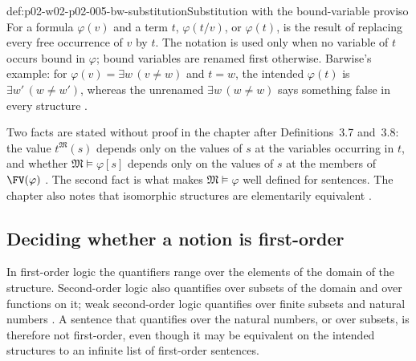 \begin{hbconvention}{def:p02-w02-p02-005-bw-substitution}{Substitution with the bound-variable proviso}
For a formula \(\varphi(v)\) and a term \(t\), \(\varphi(t/v)\), or
\(\varphi(t)\), is the result of replacing every free occurrence of \(v\)
by \(t\).  The notation is used only when no variable of \(t\) occurs bound
in \(\varphi\); bound variables are renamed first otherwise.  Barwise's
example: for \(\varphi(v)=\exists w\,(v\neq w)\) and \(t=w\), the intended
\(\varphi(t)\) is \(\exists w'\,(w\neq w')\), whereas the unrenamed
\(\exists w\,(w\neq w)\) says something false in every structure
\cite[ch.~A.1, \S3, p.~22]{Barwise1977FirstOrder}.
\end{hbconvention}

Two facts are stated without proof in the chapter after
Definitions~3.7 and~3.8: the value \(t^{\mathfrak M}(s)\) depends only on
the values of \(s\) at the variables occurring in \(t\), and whether
\(\mathfrak M\models\varphi[s]\) depends only on the values of \(s\) at the
members of \(\FV(\varphi)\) \cite[ch.~A.1, \S3, pp.~21--22]{Barwise1977FirstOrder}.
The second fact is what makes \(\mathfrak M\models\varphi\) well defined
for sentences.  The chapter also notes that isomorphic structures are
elementarily equivalent \cite[ch.~A.1, \S3, p.~22]{Barwise1977FirstOrder}.

\subsection{Deciding whether a notion is first-order}
\label{sec:p02-w02-p02-005-barwise-realm}

In first-order logic the quantifiers range over the elements of the domain
of the structure.  Second-order logic also quantifies over subsets of the
domain and over functions on it; weak second-order logic quantifies over
finite subsets and natural numbers \cite[ch.~A.1, \S2, p.~7]{Barwise1977FirstOrder}.
A sentence that quantifies over the natural numbers, or over subsets, is
therefore not first-order, even though it may be equivalent on the
intended structures to an infinite list of first-order sentences.

